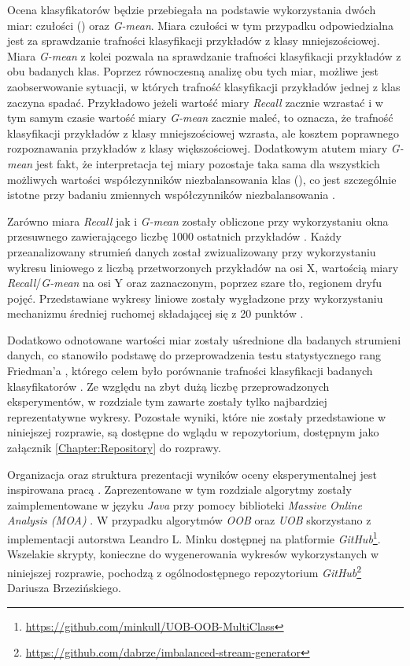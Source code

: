 Ocena klasyfikatorów będzie przebiegała na podstawie wykorzystania dwóch miar: czułości () oraz \textit{G-mean}. Miara czułości w tym przypadku odpowiedzialna jest za sprawdzanie trafności klasyfikacji przykładów z klasy mniejszościowej. Miara \textit{G-mean} z kolei pozwala na sprawdzanie trafności klasyfikacji przykładów z obu badanych klas. Poprzez równoczesną analizę obu tych miar, możliwe jest zaobserwowanie sytuacji, w których trafność klasyfikacji przykładów jednej z klas zaczyna spadać. Przykładowo jeżeli wartość miary \textit{Recall} zacznie wzrastać i w tym samym czasie wartość miary \textit{G-mean} zacznie maleć, to oznacza, że trafność klasyfikacji przykładów z klasy mniejszościowej wzrasta, ale kosztem poprawnego rozpoznawania przykładów z klasy większościowej. Dodatkowym atutem miary \textit{G-mean} jest fakt, że interpretacja tej miary pozostaje taka sama dla wszystkich możliwych wartości współczynników niezbalansowania klas (), co jest szczególnie istotne przy badaniu zmiennych współczynników niezbalansowania \cite{Article:TypyPrzykladow}.

Zarówno miara \textit{Recall} jak i \textit{G-mean} zostały obliczone przy wykorzystaniu okna przesuwnego zawierającego liczbę 1000 ostatnich przykładów \cite{Article:Evaluation}. Każdy przeanalizowany strumień danych został zwizualizowany przy wykorzystaniu wykresu liniowego z liczbą przetworzonych przykładów na osi X, wartością miary \textit{Recall}/\textit{G-mean} na osi Y oraz zaznaczonym, poprzez szare tło, regionem dryfu pojęć. Przedstawiane wykresy liniowe zostały wygładzone przy wykorzystaniu mechanizmu średniej ruchomej składającej się z 20 punktów \cite{Article:TypyPrzykladow}.

Dodatkowo odnotowane wartości miar zostały uśrednione dla badanych strumieni danych, co stanowiło podstawę do przeprowadzenia testu statystycznego rang Friedman'a \cite{Article:Friedman}, którego celem było porównanie trafności klasyfikacji badanych klasyfikatorów \cite{Article:TypyPrzykladow}. Ze względu na zbyt dużą liczbę przeprowadzonych eksperymentów, w rozdziale tym zawarte zostały tylko najbardziej reprezentatywne wykresy. Pozostałe wyniki, które nie zostały przedstawione w niniejszej rozprawie, są dostępne do wglądu w repozytorium, dostępnym jako załącznik \ref{Chapter:Repository} do rozprawy.

Organizacja oraz struktura prezentacji wyników oceny eksperymentalnej jest inspirowana pracą \cite{Article:TypyPrzykladow}. Zaprezentowane w tym rozdziale algorytmy zostały zaimplementowane w języku \textit{Java} przy pomocy biblioteki \textit{Massive Online Analysis (MOA)} \cite{Article:MOA}. W przypadku algorytmów \textit{OOB} oraz \textit{UOB} skorzystano z implementacji autorstwa Leandro L. Minku dostępnej na platformie \textit{GitHub}\footnote{\url{https://github.com/minkull/UOB-OOB-MultiClass}}. Wszelakie skrypty, konieczne do wygenerowania wykresów wykorzystanych w niniejszej rozprawie, pochodzą z ogólnodostępnego repozytorium \textit{GitHub}\footnote{\url{https://github.com/dabrze/imbalanced-stream-generator}} Dariusza Brzezińskiego.

